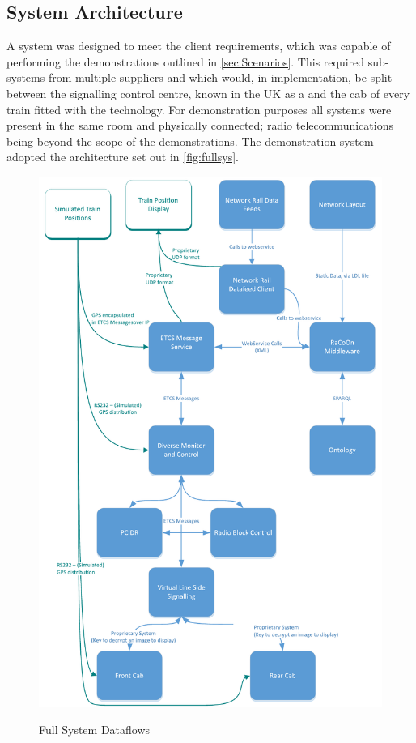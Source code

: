 \subsection{System Architecture}
A system was designed to meet the client requirements, which was capable of performing the demonstrations outlined in \autoref{sec:Scenarios}. This required sub-systems from multiple suppliers and which would, in implementation, be split between the signalling control centre, known in the UK as a  and the cab of every train fitted with the technology. For demonstration purposes all systems were present in the same room and physically connected; radio telecommunications being beyond the scope of the demonstrations. The demonstration system adopted the architecture set out in \autoref{fig:fullsys}. 

\begin{figure}[H]
\myfloatalign
{\includegraphics[max height=\textheight,max width=\linewidth]{gfx/FullSystem}} 
\caption{Full System Dataflows}
\label{fig:fullsys}
\end{figure}

